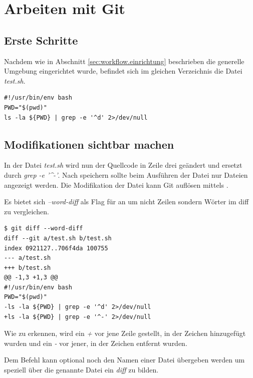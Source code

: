 \section{Arbeiten mit Git}
\label{sec:work-with-git}

\subsection{Erste Schritte}
\label{sec:work-with-git.first-steps}
Nachdem wie in Abschnitt \ref{sec:workflow.einrichtung} beschrieben die generelle Umgebung eingerichtet wurde, befindet sich im gleichen Verzeichnis die Datei \textit{test.sh}.

\begin{verbatim}
#!/usr/bin/env bash
PWD="$(pwd)"
ls -la ${PWD} | grep -e '^d' 2>/dev/null
\end{verbatim}

\subsection{Modifikationen sichtbar machen}
\label{sec:work-with-git.modifikation}
In der Datei \textit{test.sh} wird nun der Quellcode in Zeile drei geändert und ersetzt durch \textit{ grep -e '\^{}-'}. Nach speichern sollte beim Ausführen der Datei nur Dateien angezeigt werden. Die Modifikation der Datei kann Git auflösen mittels \textit{}.

\begin{INFO}
  Es bietet sich \textit{--word-diff} als Flag für \textit{} an um nicht Zeilen sondern Wörter im diff zu vergleichen.
\end{INFO}

\begin{verbatim}
$ git diff --word-diff
diff --git a/test.sh b/test.sh
index 0921127..706f4da 100755
--- a/test.sh
+++ b/test.sh
@@ -1,3 +1,3 @@
#!/usr/bin/env bash
PWD="$(pwd)"
-ls -la ${PWD} | grep -e '^d' 2>/dev/null
+ls -la ${PWD} | grep -e '^-' 2>/dev/null
\end{verbatim}

Wie zu erkennen, wird ein \textit{+} vor jene Zeile gestellt, in der Zeichen hinzugefügt wurden und ein \textit{-} vor jener, in der Zeichen entfernt wurden.

Dem Befehl \textit{} kann optional noch den Namen einer Datei übergeben werden um speziell über die genannte Datei ein \textit{diff} zu bilden.


